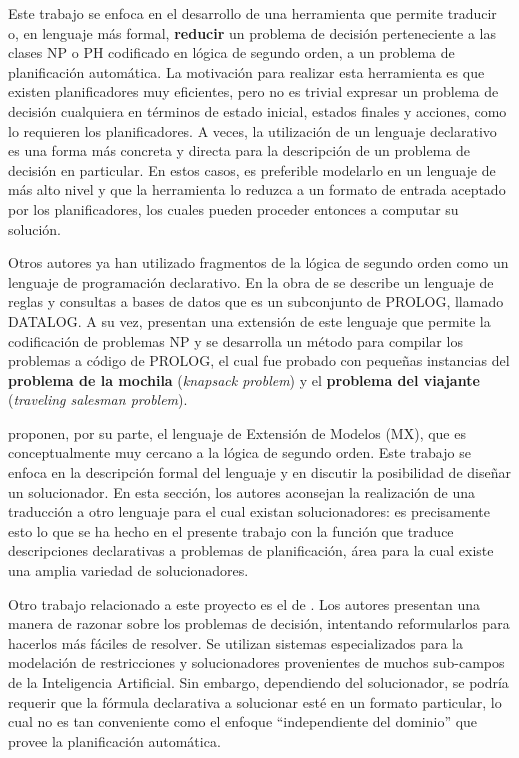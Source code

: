 Este trabajo se enfoca en el desarrollo de una herramienta que permite
traducir o, en lenguaje más formal, \textbf{reducir} un problema de
decisión perteneciente a las clases NP o PH codificado en lógica de segundo orden,
a un problema de planificación automática. 
La motivación para realizar esta herramienta es que
existen planificadores muy eficientes, pero no es trivial
expresar un problema de decisión cualquiera en términos de estado inicial,
estados finales y acciones, como lo requieren los
planificadores. A veces, la utilización de un lenguaje declarativo es una forma
más concreta y directa para la descripción de un problema de decisión en
particular. En estos casos, es preferible modelarlo en un lenguaje de más alto
nivel y que la herramienta lo reduzca a un formato de entrada aceptado por
los planificadores, los cuales pueden proceder entonces a computar su solución.

Otros autores ya han utilizado fragmentos de la lógica de segundo orden como un lenguaje de
programación declarativo. En la obra de \cite{reiter:cwa} se describe un
lenguaje de reglas y consultas a bases de datos que es un subconjunto de
PROLOG, llamado DATALOG. A su vez, \cite{cadoli:npspec} presentan una
extensión de este lenguaje que permite la codificación de problemas NP y
se desarrolla un método para compilar los problemas a código de PROLOG, el cual
fue probado con pequeñas instancias del \textbf{problema de la mochila}
(\textit{knapsack problem}) y el \textbf{problema del viajante}
(\textit{traveling salesman problem}).

\cite{mitchell:npsearch} proponen, por su parte, el lenguaje de
Extensión de Modelos (MX), que es conceptualmente muy cercano a la lógica de
segundo orden. Este trabajo se enfoca en la descripción formal del lenguaje y
en discutir la posibilidad de diseñar un solucionador. En esta sección, los
autores aconsejan la realización de una traducción a otro lenguaje para el cual
existan solucionadores: es precisamente esto lo que se ha hecho en el presente
trabajo con la función que traduce descripciones declarativas a problemas
de planificación, área para la cual existe una amplia variedad de solucionadores.

Otro trabajo relacionado a este proyecto es el de \cite{cadoli:safedelay}. Los
autores presentan una manera de razonar sobre los problemas de
decisión, intentando reformularlos para hacerlos más fáciles de resolver. Se
utilizan sistemas especializados para la modelación de restricciones y
solucionadores provenientes de muchos sub-campos de la Inteligencia Artificial.
Sin embargo, dependiendo del solucionador, se podría requerir que la fórmula
declarativa a solucionar esté en un formato particular, lo cual no es tan
conveniente como el enfoque ``independiente del dominio'' que provee la
planificación automática.

